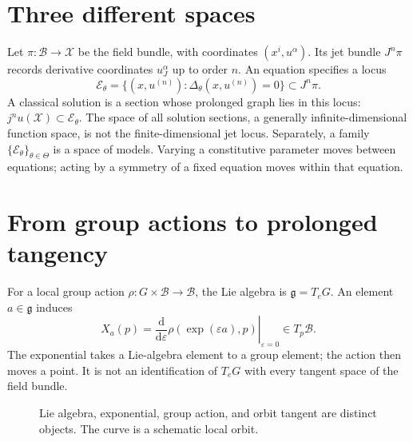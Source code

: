 \documentclass[11pt,a4paper,oneside]{report}
\numberwithin{equation}{chapter}
\newcommand{\E}{\mathcal E}
\newcommand{\dd}{\mathrm d}
\begin{document}
\section{Three different spaces}
Let $\pi:\mathcal B\to\mathcal X$ be the field bundle, with coordinates $(x^i,u^\alpha)$. Its jet bundle $J^n\pi$ records derivative coordinates $u^\alpha_J$ up to order $n$. An equation specifies a locus
\begin{equation}
\E_\theta=\{(x,u^{(n)}):\Delta_\theta(x,u^{(n)})=0\}\subset J^n\pi.
\end{equation}
A classical solution is a section whose prolonged graph lies in this locus: $j^nu(\mathcal X)\subset\E_\theta$. The space of all solution sections, a generally infinite-dimensional function space, is not the finite-dimensional jet locus. Separately, a family $\{\E_\theta\}_{\theta\in\Theta}$ is a space of models. Varying a constitutive parameter moves between equations; acting by a symmetry of a fixed equation moves within that equation.

\section{From group actions to prolonged tangency}
For a local group action $\rho:G\times\mathcal B\to\mathcal B$, the Lie algebra is $\mathfrak g=T_eG$. An element $a\in\mathfrak g$ induces
\begin{equation}
X_a(p)=\left.\frac{\dd}{\dd\varepsilon}\rho(\exp(\varepsilon a),p)\right|_{\varepsilon=0}\in T_p\mathcal B.
\end{equation}
The exponential takes a Lie-algebra element to a group element; the action then moves a point. It is not an identification of $T_eG$ with every tangent space of the field bundle.

\begin{figure}[htbp]\centering
{}
\caption{Lie algebra, exponential, group action, and orbit tangent are distinct objects. The curve is a schematic local orbit.}\label{fig:group}
\end{figure}
\end{document}
